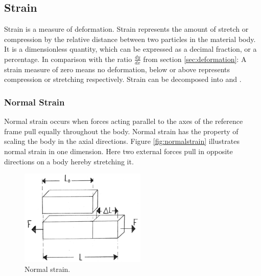 
\subsection{Strain}
\label{sec:physics_strain}
%
Strain is a measure of deformation. Strain represents the amount of
stretch or compression by the relative distance between two particles
in the material body. It is a dimensionless quantity, which can be
expressed as a decimal fraction, or a percentage.
%
In comparison with the ratio $\frac{dy}{dx}$ from section
\vref{sec:deformation}: A strain measure of zero means no deformation,
below or above represents compression or stretching respectively.
%
Strain can be decomposed into  and
.


\subsubsection{Normal Strain}
Normal strain occurs when forces acting parallel to the axes of the
reference frame pull equally throughout the body. Normal strain has
the property of scaling the body in the axial directions. Figure
\vref{fig:normalstrain} illustrates normal strain in one
dimension. Here two external forces pull in opposite
directions on a body hereby stretching it.

\begin{figure}
  \centering
  \includegraphics[width=6cm]{./images/physics_normalstrain.png}
\caption{Normal strain.}
\label{fig:normalstrain}
\end{figure}

